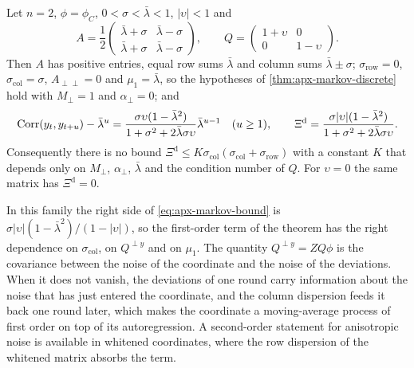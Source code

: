 \begin{proposition}\label{prop:apx-markov-anisotropic}
Let $n=2$, $\phi=\phi_C$, $0<\sigma<\bar\lambda<1$, $\lvert\upsilon\rvert<1$ and
\begin{equation*}
A=\frac12\begin{pmatrix}\bar\lambda+\sigma&\bar\lambda-\sigma\\\bar\lambda+\sigma&\bar\lambda-\sigma\end{pmatrix},\qquad Q=\begin{pmatrix}1+\upsilon&0\\0&1-\upsilon\end{pmatrix}.
\end{equation*}
Then $A$ has positive entries, equal row sums $\bar\lambda$ and column sums $\bar\lambda\pm\sigma$; $\sigma_{\mathrm{row}}=0$, $\sigma_{\mathrm{col}}=\sigma$, $A_{\perp\perp}=0$ and $\mu_1=\bar\lambda$, so the hypotheses of \cref{thm:apx-markov-discrete} hold with $M_\perp=1$ and $\alpha_\perp=0$; and
\begin{equation}\label{eq:apx-markov-anisotropic}
\operatorname{Corr}(y_t,y_{t+u})-\bar\lambda^u=\frac{\sigma\upsilon(1-\bar\lambda^2)}{1+\sigma^2+2\bar\lambda\sigma\upsilon}\bar\lambda^{u-1}\quad(u\ge1),\qquad\Xi^{\mathrm d}=\frac{\sigma\lvert\upsilon\rvert(1-\bar\lambda^2)}{1+\sigma^2+2\bar\lambda\sigma\upsilon}.
\end{equation}
Consequently there is no bound $\Xi^{\mathrm d}\le K\sigma_{\mathrm{col}}(\sigma_{\mathrm{col}}+\sigma_{\mathrm{row}})$ with a constant $K$ that depends only on $M_\perp$, $\alpha_\perp$, $\bar\lambda$ and the condition number of $Q$. For $\upsilon=0$ the same matrix has $\Xi^{\mathrm d}=0$.
\end{proposition}

In this family the right side of \eqref{eq:apx-markov-bound} is $\sigma\lvert\upsilon\rvert(1-\bar\lambda^2)/(1-\lvert\upsilon\rvert)$, so the first-order term of the theorem has the right dependence on $\sigma_{\mathrm{col}}$, on $Q^{\perp y}$ and on $\mu_1$. The quantity $Q^{\perp y}=ZQ\phi$ is the covariance between the noise of the coordinate and the noise of the deviations. When it does not vanish, the deviations of one round carry information about the noise that has just entered the coordinate, and the column dispersion feeds it back one round later, which makes the coordinate a moving-average process of first order on top of its autoregression. A second-order statement for anisotropic noise is available in whitened coordinates, where the row dispersion of the whitened matrix absorbs the term.

